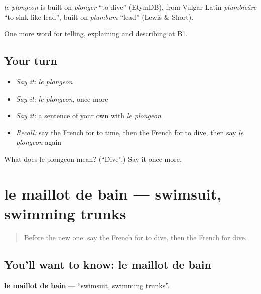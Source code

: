 \begin{cousinweb}
\emph{le plongeon} is built on \emph{plonger} \textquotedblleft{}to dive\textquotedblright{} (EtymDB), from Vulgar Latin \emph{plumbicāre} \textquotedblleft{}to sink like lead\textquotedblright{}, built on \emph{plumbum} \textquotedblleft{}lead\textquotedblright{} (Lewis \& Short).
\end{cousinweb}

\begin{grammarlens}[title={What you've built}]
One more word for telling, explaining and describing at B1.
\end{grammarlens}

\subsection*{Your turn}
\begin{itemize}
\raggedright
  \item \emph{Say it:} \emph{le plongeon}
  \item \emph{Say it:} \emph{le plongeon}, once more
  \item \emph{Say it:} a sentence of your own with \emph{le plongeon}
  \item \emph{Recall:} say the French for to time, then the French for to dive, then say \emph{le plongeon} again
\end{itemize}

\begin{tcolorbox}[breakable,colback=teal!4,colframe=teal!35!black,title={Before you move on}]
What does le plongeon mean? (\textquotedblleft{}Dive\textquotedblright{}.) Say it once more.
\end{tcolorbox}
\section[le maillot de bain]{le maillot de bain — swimsuit, swimming trunks}

\label{lesson:FR-C509-maillot-de-bain}



\begin{quote}
Before the new one: say the French for to dive, then the French for dive.
\end{quote}

\subsection*{You'll want to know: le maillot de bain}
\textbf{le maillot de bain} — \textquotedblleft{}swimsuit, swimming trunks\textquotedblright{}.

